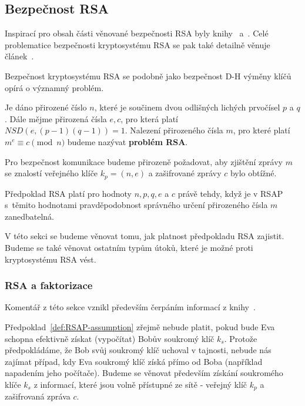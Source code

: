 \documentclass[
  program=infoi,
  biblatex=false,
  figures=true,
  glossaries,
  tables=false,
  sourcecodes=true,
  index
]{kidiplom}
\begin{document}
        
\subsection{Bezpečnost RSA}\label{sub:RSA-security}

    Inspirací pro obsah části věnované bezpečnosti RSA byly knihy~\cite{rsa-and-public} a~\cite{handbook}.
    Celé problematice bezpečnosti kryptosystému RSA se pak také detailně věnuje článek~\cite{20-years-attacks}.

    Bezpečnost kryptosystému RSA se podobně jako bezpečnost D-H výměny klíčů opírá o významný problém.

    \begin{definition}

        Je dáno přirozené číslo $n$, které je součinem dvou odlišných lichých prvočísel $p$ a $q$.
        Dále mějme přirozená čísla $e,c$, pro která platí $NSD(e, (p-1)(q-1)) = 1$.
        Nalezení přirozeného čísla $m$, pro které platí $m^e \equiv c \pmod{n}$ budeme nazývat \textbf{problém RSA}.

    \end{definition}

    Pro bezpečnost komunikace budeme přirozeně požadovat, aby zjištění zprávy $m$ se znalostí
    veřejného klíče $k_p = (n,e)$ a zašifrované zprávy $c$ bylo obtížné.

    \begin{definition}\label{def:RSAP-assumption}
                    
        Předpoklad RSA platí pro hodnoty $n,p,q,e$ a $c$ právě tehdy, když
        je v RSAP s~těmito hodnotami pravděpodobnost správného určení přirozeného čísla $m$ zanedbatelná. 

    \end{definition}

    V této sekci se budeme věnovat tomu, jak platnost předpokladu RSA zajistit.
    Budeme se také věnovat ostatním typům útoků, které je možné proti kryptosystému RSA vést.

    
    \subsubsection{RSA a faktorizace}\label{ss:RSA-factorization}

        Komentář z této sekce vznikl především čerpáním informací z knihy~\cite{handbook}.

        Předpoklad~\ref{def:RSAP-assumption} zřejmě nebude platit, pokud bude Eva schopna efektivně získat (vypočítat)
        Bobův soukromý klíč $k_s$.
        Protože předpokládáme, že Bob svůj soukromý klíč uchoval v tajnosti, nebude nás zajímat
        případ, kdy Eva soukromý klíč získá přímo od Boba (například napadením jeho počítače).
        Budeme se věnovat především získání soukromého klíče $k_s$ z informací,
        které jsou volně přístupné ze sítě - veřejný klíč $k_p$ a zašifrovaná zpráva $c$.
\end{document}
